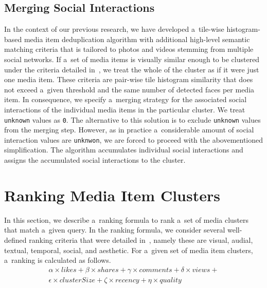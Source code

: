 \documentclass{sig-alternate}
\begin{document}
\subsection{Merging Social Interactions}
\label{sec:merging-social-interactions}

In the context of our previous research,
we have developed a~tile-wise histogram-based
media item deduplication algorithm
with additional high-level semantic matching criteria
that is tailored to photos and videos stemming from multiple social networks.
If a~set of media items is visually similar enough to be clustered
under the criteria detailed in~\cite{rizzo2012whatfresh},
we treat the whole of the cluster
as if it were just one media item.
These criteria are pair-wise tile histogram similarity 
that does not exceed a~given threshold
and the same number of detected faces per media item.
In consequence, we specify a~merging strategy
for the associated social interactions of the individual media items
in the particular cluster.
We treat \texttt{unknown} values as \texttt{0}.
The alternative to this solution is to exclude \texttt{unknown} values
from the merging step.
However, as in practice a~considerable amount of
social interaction values are \texttt{unknwon},
we are forced to proceed with the abovementioned simplification.
The algorithm accumulates individual social interactions
and assigns the accumulated social interactions to the cluster.

\section{Ranking Media Item Clusters}

In this section, we describe a~ranking formula to rank
a~set of media clusters that match a~given query.
In the ranking formula, we consider several well-defined ranking criteria
that were detailed in~\cite{steiner2012definingaesthetic},
namely these are visual, audial, textual, temporal, social, and aesthetic.
For a~given set of media item clusters, a~ranking is calculated as follows.
\vspace{-1em}
\begin{gather}
  \alpha \times \mathit{likes} + \beta \times \mathit{shares} +
  \gamma \times \mathit{comments} + \delta \times \mathit{views} + \nonumber\\
  \epsilon \times \mathit{clusterSize} + \zeta \times \mathit{recency} +
  \eta \times \mathit{quality}
\end{gather}
\end{document}

